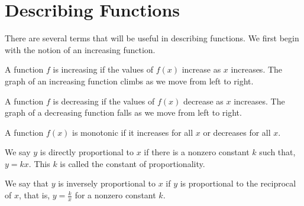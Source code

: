 \documentclass[10pt,]{book}
\theoremstyle{plain}
\theoremstyle{definition}
\theoremstyle{definition}
\theoremstyle{definition}
\theoremstyle{definition}
\numberwithin{equation}{section}
\let\oldsection\section
\renewcommand\section{\znewpage\oldsection}
\begin{document}
\section[{Describing Functions}]{Describing Functions}\label{subsection-8}
\hypertarget{p-88}{}%
There are several terms that will be useful in describing functions.  We first begin with the notion of an increasing function.%
\begin{assemblage}\label{assemblage-8}
\hypertarget{p-89}{}%
A function \(f\) is increasing if the values of \(f(x)\) increase as \(x\) increases. The graph of an increasing function climbs as we move from left to right.%
\end{assemblage}
\begin{assemblage}\label{assemblage-9}
\hypertarget{p-90}{}%
A function \(f\) is decreasing if the values of \(f(x)\) decrease as \(x\) increases. The graph of a decreasing function falls as we move from left to right.%
\end{assemblage}
\begin{assemblage}\label{assemblage-10}
\hypertarget{p-91}{}%
A function \(f(x)\) is monotonic if it increases for all \(x\) or decreases for all \(x\).%
\end{assemblage}
\begin{assemblage}\label{assemblage-11}
\hypertarget{p-92}{}%
We say \(y\) is directly proportional to \(x\) if there is a nonzero constant \(k\) such that, \(y = kx\). This \(k\) is called the constant of proportionality.%
\end{assemblage}
\begin{assemblage}\label{assemblage-12}
\hypertarget{p-93}{}%
We say that \(y\) is inversely proportional to \(x\) if \(y\) is proportional to the reciprocal of \(x\), that is, \(y = \frac{k}{x}\) for a nonzero constant \(k\).%
\end{assemblage}
\typeout{************************************************}
\typeout{************************************************}
\end{document}
